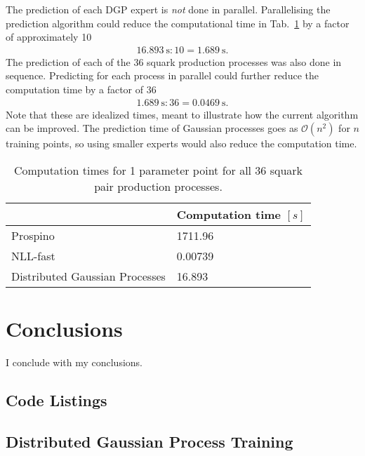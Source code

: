 \documentclass[twoside,english]{uiofysmaster}
\begin{document}
{The prediction of each DGP expert is \textit{not} done in parallel. Parallelising the prediction algorithm could reduce the computational time in Tab.~\ref{Tab :: results : Computation times} by a factor of approximately 10
\begin{align*}
16.893~\mathrm{s} : 10 = 1.689~\mathrm{s}. 
\end{align*}
The prediction of each of the 36 squark production processes was also done in sequence. Predicting for each process in parallel could further reduce the computation time by a factor of 36
\begin{align*}
1.689~\mathrm{s} : 36 = 0.0469~\mathrm{s}.
\end{align*}
Note that these are idealized times, meant to illustrate how the current algorithm can be improved. The prediction time of Gaussian processes goes as $\mathcal{O}(n^2)$ for $n$ training points, so using smaller experts would also reduce the computation time.



\begin{table}
\centering
\begin{tabular}{@{}ll@{}} \toprule
 & Computation time $[s]$\\ \midrule
Prospino & 1711.96 \\
NLL-fast & 0.00739\\
Distributed Gaussian Processes & 16.893\\
\bottomrule
\end{tabular}
\caption{Computation times for 1 parameter point for all 36 squark pair production processes.}
\label{Tab :: results : Computation times}
\end{table}

\chapter*{Conclusions}

I conclude with my conclusions.

\begin{appendices}


\chapter{Code Listings}

\section{Distributed Gaussian Process Training}\label{App:Distributed Gaussian Process Training}


\end{appendices}}
\end{document}

